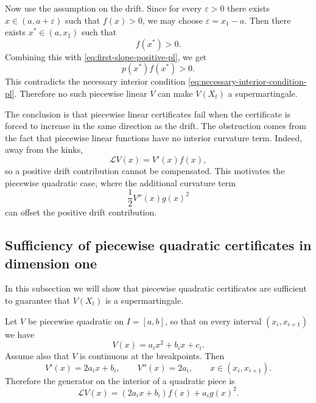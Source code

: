 \begin{fact}
Now use the assumption on the drift. Since for every $\varepsilon>0$ there
exists $x\in(a,a+\varepsilon)$ such that $f(x)>0$, we may choose
$\varepsilon=x_1-a$. Then there exists $x^\ast\in(a,x_1)$ such that
\begin{equation}
    f(x^\ast)>0.
\end{equation}
Combining this with \eqref{eq:first-slope-positive-pl}, we get
\begin{equation}
    p(x^\ast)f(x^\ast)>0.
\end{equation}
This contradicts the necessary interior condition
\eqref{eq:necessary-interior-condition-pl}. Therefore no such piecewise
linear $V$ can make $V(X_t)$ a supermartingale.

\end{fact}

The conclusion is that piecewise linear certificates fail when the certificate
is forced to increase in the same direction as the drift. The obstruction comes
from the fact that piecewise linear functions have no interior curvature term.
Indeed, away from the kinks,
\begin{equation}
\mathcal L V(x)=V'(x)f(x),
\end{equation}
so a positive drift contribution cannot be compensated. This motivates the
piecewise quadratic case, where the additional curvature term
\begin{equation}
\frac12 V''(x)g(x)^2
\end{equation}
can offset the positive drift contribution.

\subsection{Sufficiency of piecewise quadratic certificates in dimension one}

In this subsection we will show that piecewise quadratic certificates are sufficient 
to guarantee that $V(X_t)$ is a supermartingale. 

Let $V$ be piecewise quadratic on $I=[a,b]$, so that on every interval
$(x_i,x_{i+1})$ we have
\begin{equation}
    V(x)=a_ i x^2+ b_i x+ c_i .
\end{equation}
Assume also that $V$ is continuous at the breakpoints. Then
\begin{equation}
    V'(x)=2a_i x+b_i,
    \qquad
    V''(x)=2a_i,
    \qquad x\in(x_i,x_{i+1}).
\end{equation}
Therefore the generator on the interior of a quadratic piece is
\begin{equation}
    \mathcal L V(x)
    =
    \left(2a_i x+b_i\right)f(x)
    +
    a_i g(x)^2.
    \label{eq:piecewise-quadratic-generator}
\end{equation}

